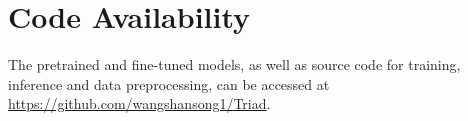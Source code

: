 \section{Code Availability}
The pretrained and fine-tuned models, as well as source code for training, inference and data preprocessing, can be accessed at \url{https://github.com/wangshansong1/Triad}.